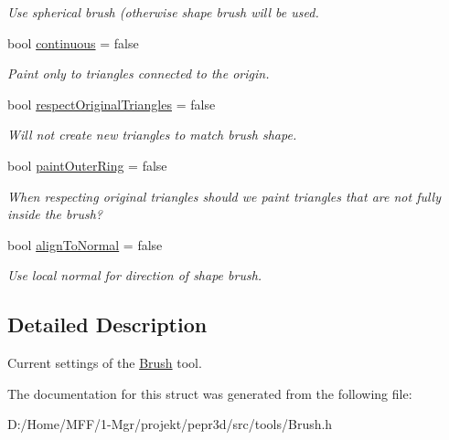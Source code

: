 \begin{DoxyCompactItemize}
\begin{DoxyCompactList}\small\item\em Use spherical brush (otherwise shape brush will be used. \end{DoxyCompactList}\item 
\mbox{\label{structpepr3d_1_1_brush_settings_a45ac5bb04d5a502b31811ecd94d6fe2b}} 
bool \mbox{\hyperlink{structpepr3d_1_1_brush_settings_a45ac5bb04d5a502b31811ecd94d6fe2b}{continuous}} = false
\begin{DoxyCompactList}\small\item\em Paint only to triangles connected to the origin. \end{DoxyCompactList}\item 
\mbox{\label{structpepr3d_1_1_brush_settings_adddaabb9e5cd0271e781423eb77765db}} 
bool \mbox{\hyperlink{structpepr3d_1_1_brush_settings_adddaabb9e5cd0271e781423eb77765db}{respect\+Original\+Triangles}} = false
\begin{DoxyCompactList}\small\item\em Will not create new triangles to match brush shape. \end{DoxyCompactList}\item 
\mbox{\label{structpepr3d_1_1_brush_settings_abe64fa6555c4a22a17cdf58779b0288e}} 
bool \mbox{\hyperlink{structpepr3d_1_1_brush_settings_abe64fa6555c4a22a17cdf58779b0288e}{paint\+Outer\+Ring}} = false
\begin{DoxyCompactList}\small\item\em When respecting original triangles should we paint triangles that are not fully inside the brush? \end{DoxyCompactList}\item 
\mbox{\label{structpepr3d_1_1_brush_settings_a4949a6501a1ac9525c0b8ef4219bfdec}} 
bool \mbox{\hyperlink{structpepr3d_1_1_brush_settings_a4949a6501a1ac9525c0b8ef4219bfdec}{align\+To\+Normal}} = false
\begin{DoxyCompactList}\small\item\em Use local normal for direction of shape brush. \end{DoxyCompactList}\end{DoxyCompactItemize}


\subsection{Detailed Description}
Current settings of the \mbox{\hyperlink{classpepr3d_1_1_brush}{Brush}} tool. 

The documentation for this struct was generated from the following file\+:\begin{DoxyCompactItemize}
\item 
D\+:/\+Home/\+M\+F\+F/1-\/\+Mgr/projekt/pepr3d/src/tools/Brush.\+h\end{DoxyCompactItemize}
